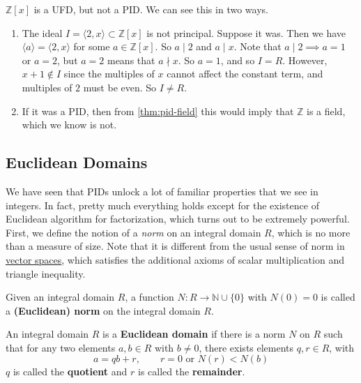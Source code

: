   \begin{example}
    \label{ex:ufd-that-is-not-a-pid}
    $\mathbb{Z}[x]$ is a UFD, but not a PID. We can see this in two ways. 
    \begin{enumerate}
      \item The ideal $I = \langle 2, x \rangle \subset \mathbb{Z}[x]$ is not principal. Suppose it was. Then we have $\langle a \rangle = \langle 2, x \rangle$ for some $a \in \mathbb{Z}[x]$. So $a \mid 2$ and $a \mid x$. Note that $a \mid 2 \implies a = 1$ or $a = 2$, but $a = 2$ means that $a \nmid x$. So $a = 1$, and so $I = R$. However, $x + 1 \not\in I$ since the multiples of $x$ cannot affect the constant term, and multiples of $2$ must be even. So $I \neq R$. 
      \item If it was a PID, then from \ref{thm:pid-field} this would imply that $\mathbb{Z}$ is a field, which we know is not. 
    \end{enumerate}
  \end{example}

\subsection{Euclidean Domains}

  We have seen that PIDs unlock a lot of familiar properties that we see in integers. In fact, pretty much everything holds except for the existence of Euclidean algorithm for factorization, which turns out to be extremely powerful. First, we define the notion of a \textit{norm} on an integral domain $R$, which is no more than a measure of size. Note that it is different from the usual sense of norm in \hyperref[st-def:vector-space]{vector spaces}, which satisfies the additional axioms of scalar multiplication and triangle inequality. 

  \begin{definition}
    \label{def:norm-on-an-integral-domain}
    Given an integral domain $R$, a function $N: R \to \mathbb{N} \cup \{0\}$ with $N(0) = 0$ is called a \textbf{(Euclidean) norm} on the integral domain $R$. 
  \end{definition}

  \begin{definition}
    \label{def:euclidean-domain}
    An integral domain $R$ is a \textbf{Euclidean domain} if there is a norm $N$ on $R$ such that for any two elements $a, b \in R$ with $b \neq 0$, there exists elements $q, r \in R$, with 
    \begin{equation}
      a = qb + r, \qquad r = 0 \text{ or } N(r) < N(b) 
    \end{equation}
    $q$ is called the \textbf{quotient} and $r$ is called the \textbf{remainder}. 
  \end{definition}

